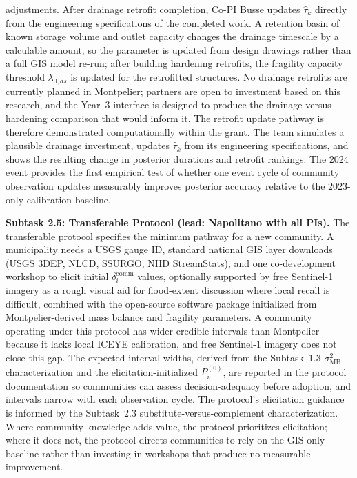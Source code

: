 \documentclass[11pt]{article}
\begin{document}
adjustments.
After drainage retrofit completion, Co-PI Busse updates $\hat{\tau}_k$ directly
from the engineering specifications of the completed work. A retention basin of
known storage volume and outlet capacity changes the drainage timescale by a
calculable amount, so the parameter is updated from design drawings rather than
a full GIS model re-run; after building hardening retrofits, the fragility
capacity threshold $\lambda_{0,ds}$ is updated for the retrofitted structures.
No drainage retrofits are currently planned in Montpelier; partners are open to investment based on this research, and the Year~3 interface is designed to produce the drainage-versus-hardening comparison that would inform it. The retrofit update pathway is therefore demonstrated computationally within the grant. The team simulates a plausible drainage investment, updates $\hat{\tau}_k$ from its engineering specifications, and shows the resulting change in posterior durations and retrofit rankings.
The 2024 event provides the first empirical test of whether one event cycle of
community observation updates measurably improves posterior accuracy relative to
the 2023-only calibration baseline.

\textbf{Subtask 2.5: Transferable Protocol
(lead: Napolitano with all PIs).}
The transferable protocol specifies the minimum pathway for a new community. A municipality needs a USGS gauge ID, standard national GIS layer downloads (USGS 3DEP, NLCD, SSURGO,
NHD StreamStats), and one co-development workshop to elicit initial
$\delta_i^{\mathrm{comm}}$ values, optionally supported by free Sentinel-1 imagery
as a rough visual aid for flood-extent discussion where local recall is difficult,
combined with the open-source software package
initialized from Montpelier-derived mass balance and fragility parameters.
A community operating under this protocol has wider credible intervals than Montpelier because it lacks local ICEYE calibration, and free Sentinel-1 imagery does not close this gap. The expected interval widths, derived from the Subtask~1.3 $\sigma_{\mathrm{MB}}^2$ characterization and the elicitation-initialized $P_i^{(0)}$, are reported in the protocol documentation so communities can assess decision-adequacy before adoption, and intervals narrow with each observation cycle.
The protocol's elicitation guidance is informed by the Subtask~2.3
substitute-versus-complement characterization. Where community knowledge adds
value, the protocol prioritizes elicitation; where it does not, the protocol
directs communities to rely on the GIS-only baseline rather than investing in
workshops that produce no measurable improvement.
\end{document}
